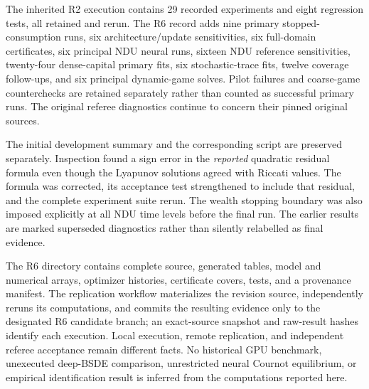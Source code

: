 \documentclass[ecta,draft]{econsocart}
\theoremstyle{definition}
\theoremstyle{remark}
\begin{document}
\begin{appendix}
The inherited R2 execution contains 29 recorded experiments and eight regression tests, all retained and rerun. The R6 record adds nine primary stopped-consumption runs, six architecture/update sensitivities, six full-domain certificates, six principal NDU neural runs, sixteen NDU reference sensitivities, twenty-four dense-capital primary fits, six stochastic-trace fits, twelve coverage follow-ups, and six principal dynamic-game solves. Pilot failures and coarse-game counterchecks are retained separately rather than counted as successful primary runs. The original referee diagnostics continue to concern their pinned original sources.

The initial development summary and the corresponding script are preserved separately. Inspection found a sign error in the \emph{reported} quadratic residual formula even though the Lyapunov solutions agreed with Riccati values. The formula was corrected, its acceptance test strengthened to include that residual, and the complete experiment suite rerun. The wealth stopping boundary was also imposed explicitly at all NDU time levels before the final run. The earlier results are marked superseded diagnostics rather than silently relabelled as final evidence.

The R6 directory contains complete source, generated tables, model and numerical arrays, optimizer histories, certificate covers, tests, and a provenance manifest. The replication workflow materializes the revision source, independently reruns its computations, and commits the resulting evidence only to the designated R6 candidate branch; an exact-source snapshot and raw-result hashes identify each execution. Local execution, remote replication, and independent referee acceptance remain different facts. No historical GPU benchmark, unexecuted deep-BSDE comparison, unrestricted neural Cournot equilibrium, or empirical identification result is inferred from the computations reported here.
\end{appendix}


\end{document}
